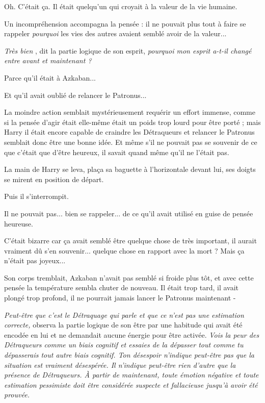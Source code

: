 Oh. C'était ça. Il était quelqu'un qui croyait à la valeur de la vie humaine.

Un incompréhension accompagna la pensée : il ne pouvait plus tout à faire se rappeler \emph{pourquoi}  les vies des autres avaient semblé avoir de la valeur...

\emph{Très bien} , dit la partie logique de son esprit, \emph{pourquoi mon esprit a-t-il changé entre avant et maintenant ?} 

Parce qu'il était à Azkaban...

Et qu'il avait oublié de relancer le Patronus...

La moindre action semblait mystérieusement requérir un effort immense, comme si la pensée d'agir était elle-même était un poids trop lourd pour être porté ; mais Harry il était encore capable de craindre les Détraqueurs et relancer le Patronus semblait donc être une bonne idée. Et même s'il ne pouvait pas se souvenir de ce que c'était que d'être heureux, il savait quand même qu'il ne l'était pas.

La main de Harry se leva, plaça sa baguette à l'horizontale devant lui, ses doigts se mirent en position de départ.

Puis il s'interrompit.

Il ne pouvait pas... bien se rappeler... de ce qu'il avait utilisé en guise de pensée heureuse.

C'était bizarre car ça avait semblé être quelque chose de très important, il aurait vraiment dû s'en souvenir... quelque chose en rapport avec la mort ? Mais ça n'était pas joyeux...

Son corps tremblait, Azkaban n'avait pas semblé si froide plus tôt, et avec cette pensée la température sembla chuter de nouveau. Il était trop tard, il avait plongé trop profond, il ne pourrait jamais lancer le Patronus maintenant -

\emph{Peut-être que c'est le Détraquage qui parle et que ce n'est pas une estimation correcte, } observa la partie logique de son être par une habitude qui avait été encodée en lui et ne demandait aucune énergie pour être activée. \emph{Vois la peur des Détraqueurs comme un biais cognitif et essaies de la dépasser tout comme tu dépasserais tout autre biais cognitif. Ton désespoir n'indique peut-être pas que la situation est vraiment désespérée. Il n'indique peut-être rien d'autre que la présence de Détraqueurs. À partir de maintenant, toute émotion négative et toute estimation pessimiste doit être considérée suspecte et fallacieuse jusqu'à avoir été prouvée.} 


